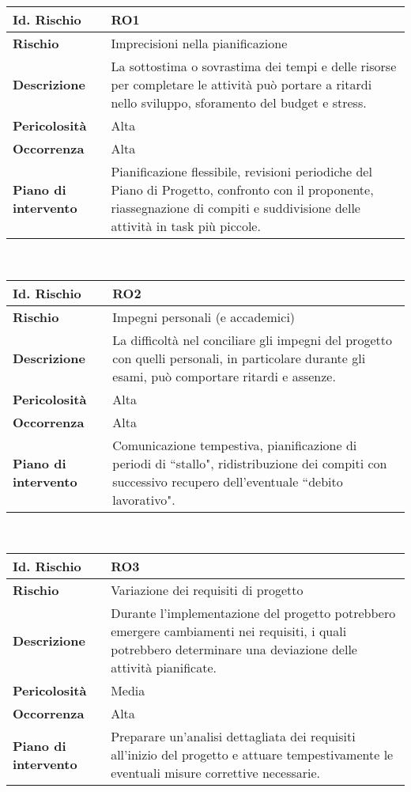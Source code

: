 \hypertarget{RO1}{}
\begin{tabular}{|L{4cm}|L{9.7cm}|}
    \hline
    \textbf{Id. Rischio} & \textbf{RO1} \\
    \hline
    \textbf{Rischio} & Imprecisioni nella pianificazione \\
    \hline
    \textbf{Descrizione} & La sottostima o sovrastima dei tempi e delle risorse per completare le attività può portare a ritardi nello sviluppo, sforamento del budget e stress. \\
    \hline
    \textbf{Pericolosità} & Alta \\
    \hline
    \textbf{Occorrenza} & Alta \\
    \hline
    \textbf{Piano di intervento} & Pianificazione flessibile, revisioni periodiche del Piano di Progetto, confronto con il proponente, riassegnazione di compiti e suddivisione delle attività in task più piccole. \\
    \hline
\end{tabular}
\\[30pt]
\hypertarget{RO2}{}
\begin{tabular}{|L{4cm}|L{9.7cm}|}
    \hline
    \textbf{Id. Rischio} & \textbf{RO2} \\
    \hline
    \textbf{Rischio} & Impegni personali (e accademici) \\
    \hline
    \textbf{Descrizione} & La difficoltà nel conciliare gli impegni del progetto con quelli personali, in particolare durante gli esami, può comportare ritardi e assenze. \\
    \hline
    \textbf{Pericolosità} & Alta \\
    \hline
    \textbf{Occorrenza} & Alta \\
    \hline
    \textbf{Piano di intervento} & Comunicazione tempestiva, pianificazione di periodi di ``stallo", ridistribuzione dei compiti con successivo recupero dell'eventuale ``debito lavorativo". \\
    \hline
\end{tabular}
\\[30pt]
\hypertarget{RO3}{}
\begin{tabular}{|L{4cm}|L{9.7cm}|}
    \hline
    \textbf{Id. Rischio} & \textbf{RO3} \\
    \hline
    \textbf{Rischio} & Variazione dei requisiti di progetto \\
    \hline
    \textbf{Descrizione} & Durante l'implementazione del progetto potrebbero emergere cambiamenti nei requisiti, i quali potrebbero determinare una deviazione delle attività pianificate. \\
    \hline
    \textbf{Pericolosità} & Media \\
    \hline
    \textbf{Occorrenza} & Alta \\
    \hline
    \textbf{Piano di intervento} & Preparare un'analisi dettagliata dei requisiti all'inizio del progetto e attuare tempestivamente le eventuali misure correttive necessarie. \\
    \hline
\end{tabular}
